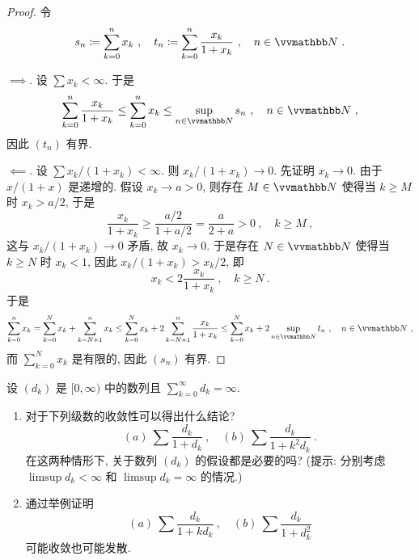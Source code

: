 \begin{proof}
    令
    \[
        s_n \coloneqq \sum_{k = 0}^n x_k\ ,\quad t_n \coloneqq \sum_{k = 0}^n \frac{x_k}{1 + x_k}\ ,\quad n \in \N\ .
    \]

    \(\implies\). 设 \(\sum x_k < \infty\). 于是
    \[
        \sum_{k = 0}^n \frac{x_k}{1 + x_k} \leq \sum_{k = 0}^n x_k \leq \sup_{n \in \N} s_n\ ,\quad n \in \N\ ,
    \]
    因此 \((t_n)\) 有界.

    \(\impliedby\). 设 \(\sum x_k / (1 + x_k) < \infty\). 则 \(x_k / (1 + x_k) \to 0\). 先证明 \(x_k \to 0\). 由于 \(x / (1 + x)\) 是递增的. 假设 \(x_k \to a > 0\), 则存在 \(M \in \N\) 使得当 \(k \geq M\) 时 \(x_k > a / 2\), 于是
    \[
        \frac{x_k}{1 + x_k} \geq \frac{a / 2}{1 + a / 2} = \frac{a}{2 + a} > 0\ ,\quad k \geq M\ ,
    \]
    这与 \(x_k / (1 + x_k) \to 0\) 矛盾, 故 \(x_k \to 0\). 于是存在 \(N \in \N\) 使得当 \(k \geq N\) 时 \(x_k < 1\), 因此 \(x_k / (1 + x_k) > x_k / 2\), 即
    \[
        x_k < 2 \frac{x_k}{1 + x_k}\ ,\quad k \geq N\ .
    \]
    于是
    \[
        \sum_{k = 0}^n x_k = \sum_{k = 0}^N x_k + \sum_{k = N + 1}^n x_k \leq \sum_{k = 0}^N x_k + 2 \sum_{k = N + 1}^n \frac{x_k}{1 + x_k} \leq \sum_{k = 0}^N x_k + 2 \sup_{n \in \N} t_n\ ,\quad n \in \N\ ,
    \]
    而 \(\sum_{k = 0}^N x_k\) 是有限的, 因此 \((s_n)\) 有界.
\end{proof}

\begin{exercise}
    设 \((d_k)\) 是 \([0, \infty)\) 中的数列且 \(\sum_{k = 0}^\infty d_k = \infty\).
    \begin{enumerate}
        \item 对于下列级数的收敛性可以得出什么结论?
        \[
            (a)\ \sum \frac{d_k}{1 + d_k}\ ,\quad (b)\ \sum \frac{d_k}{1 + k^2 d_k}\ .
        \]
        在这两种情形下, 关于数列 \((d_k)\) 的假设都是必要的吗? (提示: 分别考虑 \(\limsup d_k < \infty\) 和 \(\limsup d_k = \infty\) 的情况.)
        \item 通过举例证明
        \[
            (a)\ \sum \frac{d_k}{1 + k d_k}\ ,\quad (b)\ \sum \frac{d_k}{1 + d_k^2}
        \]
        可能收敛也可能发散.
    \end{enumerate}
\end{exercise}

